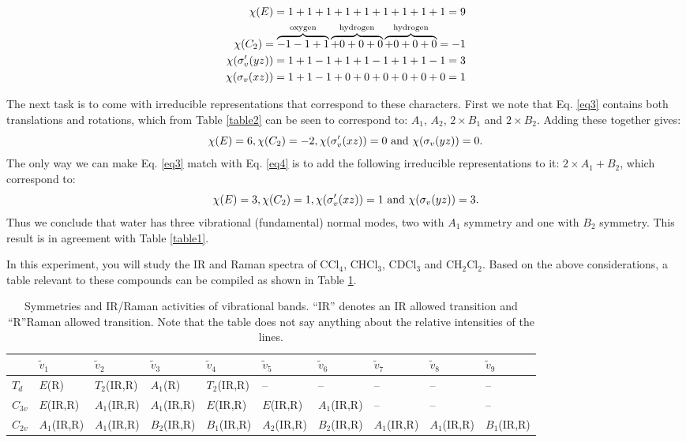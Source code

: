 \documentclass[byrevtex,amssymb,aps,pra,floatfix,letterpaper]{revtex4}
\begin{document}
\begin{eqnarray}
\label{eq3}
\chi(E) = 1 + 1 + 1 + 1 + 1 + 1 + 1 + 1 + 1 = 9\nonumber\\
\chi(C_2) = 
\mathop {\overbrace{- 1 - 1 + 1}}\limits^{\textnormal{oxygen}}
\mathop {\overbrace{+ 0 + 0 + 0}}\limits^{\textnormal{hydrogen}}
\mathop {\overbrace{+ 0 + 0 + 0}}\limits^{\textnormal{hydrogen}}
= -1\\
\chi(\sigma_v'(yz)) = 1 + 1 - 1 + 1 + 1 - 1 + 1 + 1 - 1 = 3\nonumber\\
\chi(\sigma_v(xz)) = 1 + 1 - 1 + 0 + 0 + 0 + 0 + 0 + 0 = 1\nonumber
\end{eqnarray}

The next task is to come with irreducible representations that correspond to these characters. First we note that Eq. \ref{eq3} contains both translations and rotations, which from Table \ref{table2} can be seen to correspond to: $A_1$, $A_2$, $2\times B_1$ and $2\times B_2$. Adding these together gives:
\begin{equation}
\label{eq4}
\chi(E) = 6, \chi(C_2) = -2, \chi(\sigma_v'(xz)) = 0 \textnormal{\ and\ }
\chi(\sigma_v(yz)) = 0.
\end{equation}
The only way we can make Eq. \ref{eq3} match with Eq. \ref{eq4} is to add the following irreducible representations to it: $2\times A_1 + B_2$, which correspond to:
\begin{equation}
\label{eq5}
\chi(E) = 3, \chi(C_2) = 1, \chi(\sigma_v'(xz)) = 1 \textnormal{\ and\ }
\chi(\sigma_v(yz)) = 3.
\end{equation}
Thus we conclude that water has three vibrational (fundamental) normal modes, two with $A_1$ symmetry and one with $B_2$ symmetry. This result is in agreement with Table \ref{table1}.

In this experiment, you will study the IR and Raman spectra of CCl$_4$, CHCl$_3$, CDCl$_3$ and CH$_2$Cl$_2$. Based on the above considerations, a table relevant to these compounds can be compiled as shown in Table \ref{table8}.

\begin{table}[!htp]
\caption{Symmetries and IR/Raman activities of vibrational bands. ``IR'' denotes an IR allowed transition and ``R''Raman allowed transition. Note that the table does not say anything about the relative intensities of the lines.}
\begin{tabular}{|l|l|l|l|l|l|l|l|l|l|}
\hline
 & $\tilde{v}_1$ & $\tilde{v}_2$ & $\tilde{v}_3$ & $\tilde{v}_4$ & $\tilde{v}_5$
 & $\tilde{v}_6$ & $\tilde{v}_7$ & $\tilde{v}_8$ & $\tilde{v}_9$\\
\hline
$T_d$ & $E$(R) & $T_2$(IR,R) & $A_1$(R) & $T_2$(IR,R) & -- & -- & -- & -- & --\\
\hline
$C_{3v}$ & $E$(IR,R) & $A_1$(IR,R) & $A_1$(IR,R) & $E$(IR,R) & $E$(IR,R) &
$A_1$(IR,R) & -- & -- & --\\
\hline
$C_{2v}$ & $A_1$(IR,R) & $A_1$(IR,R) & $B_2$(IR,R) & $B_1$(IR,R) & $A_2$(IR,R) &
$B_2$(IR,R) & $A_1$(IR,R) & $A_1$(IR,R) & $B_1$(IR,R)\\
\hline
\end{tabular}
\label{table8}
\end{table}
\end{document}

